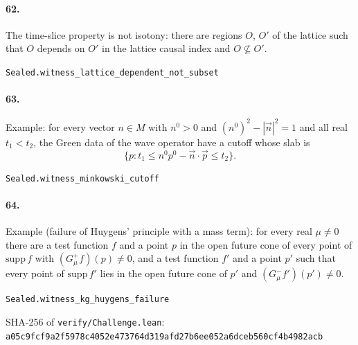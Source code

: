\documentclass[11pt]{article}
\begin{document}
\paragraph{62.} The time-slice property is not isotony: there are regions $O$, $O'$ of the lattice such that $O$ depends on $O'$ in the lattice causal index and $O \not\subseteq O'$.\par{\footnotesize\texttt{Sealed.witness\_lattice\_dependent\_not\_subset}}

\paragraph{63.} Example: for every vector $n \in M$ with $n^0 > 0$ and $(n^0)^2 - |\vec n|^2 = 1$ and all real $t_1 < t_2$, the Green data of the wave operator have a cutoff whose slab is \[\{p : t_1 \le n^0 p^0 - \vec n \cdot \vec p \le t_2\}.\]\par{\footnotesize\texttt{Sealed.witness\_minkowski\_cutoff}}

\paragraph{64.} Example (failure of Huygens' principle with a mass term): for every real $\mu \ne 0$ there are a test function $f$ and a point $p$ in the open future cone of every point of $\mathrm{supp}\, f$ with $(G_\mu^+ f)(p) \ne 0$, and a test function $f'$ and a point $p'$ such that every point of $\mathrm{supp}\, f'$ lies in the open future cone of $p'$ and $(G_\mu^- f')(p') \ne 0$.\par{\footnotesize\texttt{Sealed.witness\_kg\_huygens\_failure}}

\vfill{\footnotesize SHA-256 of \texttt{verify/Challenge.lean}: \texttt{a05c9fcf9a2f5978c4052e473764d319afd27b6ee052a6dceb560cf4b4982acb}}
\end{document}
